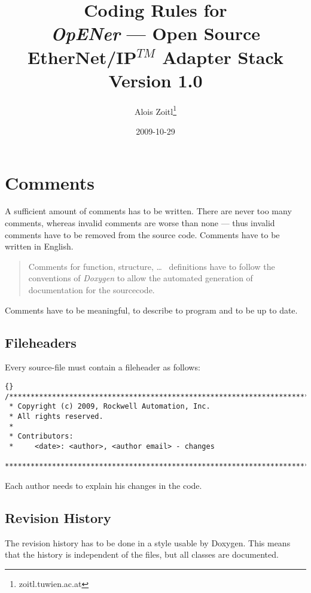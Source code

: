 \documentclass[final,a4paper,10pt, oneside]{article}
\title{Coding Rules for\\ \emph{OpENer} --- Open Source EtherNet/IP$^{TM}$ Adapter Stack\\\large Version 1.0}
\author{Alois Zoitl\thanks{zoitl\@@acin.tuwien.ac.at}}
\date{2009-10-29}
\begin{document}
\maketitle

\tableofcontents

\section{Comments}
A sufficient amount of comments has to be written. There are never too many comments, whereas invalid comments are worse than none --- thus
invalid comments have to be removed from the source code. Comments have to be written in English. 

\begin{quote}
Comments for function, structure, \ldots~ definitions have to follow the conventions of \emph{Doxygen} to allow the automated generation of documentation for the sourcecode. 
\end{quote}

Comments have to be meaningful, to describe to program and to be up to date.


\subsection{Fileheaders}
Every source-file must contain a fileheader as follows:
\begin{lstlisting}[frame=trbl]{}
/*******************************************************************************
 * Copyright (c) 2009, Rockwell Automation, Inc.
 * All rights reserved. 
 *
 * Contributors:
 *     <date>: <author>, <author email> - changes
 ******************************************************************************/
\end{lstlisting}
Each author needs to explain his changes in the code. 
\subsection{Revision History}
The revision history has to be done in a style  usable by Doxygen. This means that the history is independent of the files, but all classes are documented.
\end{document}
